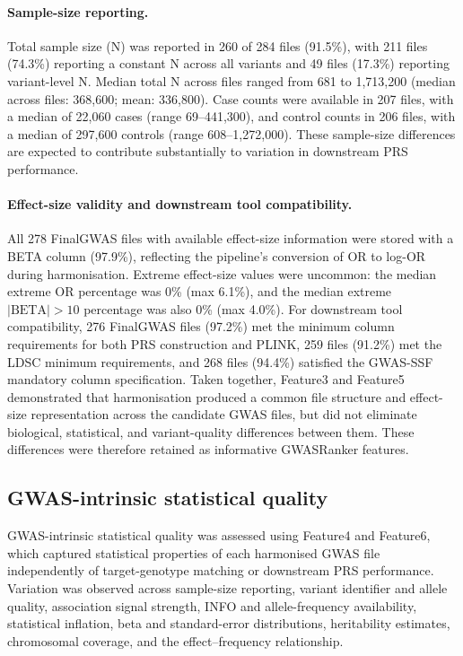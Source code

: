 \documentclass[11pt,a4paper]{article}
\begin{document}
\paragraph{Sample-size reporting.}Total sample size (N) was reported in 260 of 284 files (91.5\%), with 211 files (74.3\%) reporting a constant N across all variants and 49 files (17.3\%) reporting variant-level N. Median total N across files ranged from 681 to 1,713,200 (median across files: 368,600; mean: 336,800). Case counts were available in 207 files, with a median of 22,060 cases (range 69--441,300), and control counts in 206 files, with a median of 297,600 controls (range 608--1,272,000). These sample-size differences are expected to contribute substantially to variation in downstream PRS performance.

\paragraph{Effect-size validity and downstream tool compatibility.}All 278 FinalGWAS files with available effect-size information were stored with a BETA column (97.9\%), reflecting the pipeline's conversion of OR to log-OR during harmonisation. Extreme effect-size values were uncommon: the median extreme OR percentage was 0\% (max 6.1\%), and the median extreme $|\text{BETA}| > 10$ percentage was also 0\% (max 4.0\%). For downstream tool compatibility, 276 FinalGWAS files (97.2\%) met the minimum column requirements for both PRS construction and PLINK, 259 files (91.2\%) met the LDSC minimum requirements, and 268 files (94.4\%) satisfied the GWAS-SSF mandatory column specification. Taken together, Feature3 and Feature5 demonstrated that harmonisation produced a common file structure and effect-size representation across the candidate GWAS files, but did not eliminate biological, statistical, and variant-quality differences between them. These differences were therefore retained as informative GWASRanker features.

\subsection{GWAS-intrinsic statistical quality}

GWAS-intrinsic statistical quality was assessed using Feature4 and Feature6, which captured statistical properties of each harmonised GWAS file independently of target-genotype matching or downstream PRS performance. Variation was observed across sample-size reporting, variant identifier and allele quality, association signal strength, INFO and allele-frequency availability, statistical inflation, beta and standard-error distributions, heritability estimates, chromosomal coverage, and the effect--frequency relationship.
\end{document}
